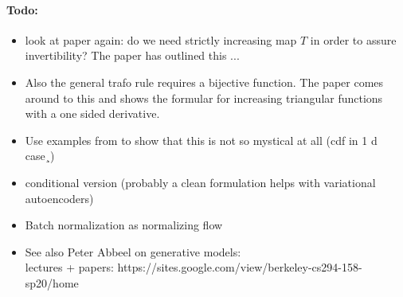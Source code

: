 \documentclass[12pt,a4paper]{article}
\begin{document}
\paragraph{Todo:} 
\begin{itemize}
\item look at paper again: do we need strictly increasing map $T$ in order to assure invertibility? The paper has outlined this ...
\item Also the general trafo rule \label{eq:pdf_trafo}  requires a bijective function. The paper comes around to this and shows the formular for increasing triangular functions with a one sided derivative.
\item Use examples from \cite{jaini_polynomial_flow_2019} to show that this is not so mystical at all (cdf in 1 d case¸)
 \item conditional version (probably a clean formulation helps with variational autoencoders)
\item Batch normalization as normalizing flow
\item See also Peter Abbeel on generative models: \\
lectures + papers: https://sites.google.com/view/berkeley-cs294-158-sp20/home \\
 
 
\end{itemize}
\end{document}
